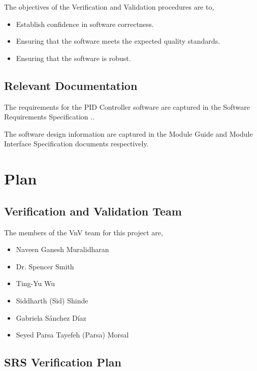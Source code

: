 \documentclass[12pt, titlepage]{article}
\begin{document}
The objectives of the Verification and Validation procedures are to,

\begin{itemize}
\item Establish confidence in software correctness.
\item Ensuring that the software meets the expected quality standards.
\item Ensuring that the software is robust.
\end{itemize}

\subsection{Relevant Documentation}


The requirements for the PID Controller software are captured in the Software
Requirements Specification \cite{SRS}.. 

The software design information are captured in the Module Guide  \cite{MG}
and Module Interface Specification \cite{MIS} documents respectively.

\section{Plan}
	
\subsection{Verification and Validation Team}


The members of the VnV team for this project are,

\begin{itemize}
\item Naveen Ganesh Muralidharan
\item Dr. Spencer Smith
\item Ting-Yu Wu	
\item Siddharth (Sid) Shinde
\item Gabriela Sánchez Díaz	
\item Seyed Parsa Tayefeh (Parsa) Morsal
\end{itemize}

\subsection{SRS Verification Plan}
\end{document}
